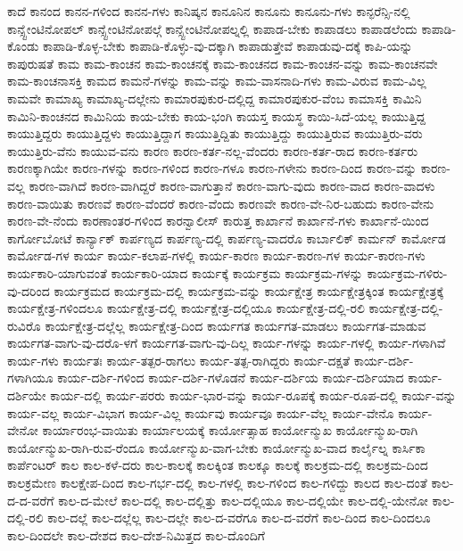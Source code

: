 {ಕಾದೆ
ಕಾನಂದ
ಕಾನನ-ಗಳಿಂದ
ಕಾನನ-ಗಳು
ಕಾನಿಷ್ಕನ
ಕಾನೂನಿನ
ಕಾನೂನು
ಕಾನೂನು-ಗಳು
ಕಾನ್ಫರೆನ್ಸಿ-ನಲ್ಲಿ
ಕಾನ್ಸ್ಟೇಂಟಿನೋಪಲ್
ಕಾನ್ಸ್ಟೇಂಟಿನೋಪಲ್ಗೆ
ಕಾನ್ಸ್ಟೇಂಟಿನೋಪಲ್ನಲ್ಲಿ
ಕಾಪಾಡ-ಬೇಕು
ಕಾಪಾಡಲು
ಕಾಪಾಡಲೆಂದು
ಕಾಪಾಡಿ-ಕೊಂಡು
ಕಾಪಾಡಿ-ಕೊಳ್ಳ-ಬೇಕು
ಕಾಪಾಡಿ-ಕೊಳ್ಳು-ವು-ದಕ್ಕಾಗಿ
ಕಾಪಾಡುತ್ತೇವೆ
ಕಾಪಾಡುವು-ದಕ್ಕೆ
ಕಾಪಿ-ಯನ್ನು
ಕಾಪುರುಷತೆ
ಕಾಮ
ಕಾಮ-ಕಾಂಚನ
ಕಾಮ-ಕಾಂಚನಕ್ಕೆ
ಕಾಮ-ಕಾಂಚನದ
ಕಾಮ-ಕಾಂಚನ-ವನ್ನು
ಕಾಮ-ಕಾಂಚನವೇ
ಕಾಮ-ಕಾಂಚನಾಸಕ್ತಿ
ಕಾಮದ
ಕಾಮನೆ-ಗಳನ್ನು
ಕಾಮ-ವನ್ನು
ಕಾಮ-ವಾಸನಾದಿ-ಗಳು
ಕಾಮ-ವಿರುವ
ಕಾಮ-ವಿಲ್ಲ
ಕಾಮವೇ
ಕಾಮಾಖ್ಯ
ಕಾಮಾಖ್ಯ-ದಲ್ಲೇನು
ಕಾಮಾರಪುಕುರ-ದಲ್ಲಿದ್ದ
ಕಾಮಾರಪುಕುರ-ವೆಂಬ
ಕಾಮಾಸಕ್ತಿ
ಕಾಮಿನಿ
ಕಾಮಿನಿ-ಕಾಂಚನದ
ಕಾಮಿನಿಯ
ಕಾಯ-ಬೇಕು
ಕಾಯ-ಭಂಗಿ
ಕಾಯಸ್ತ
ಕಾಯಸ್ಥ
ಕಾಯಿ-ಸಿದೆ-ಯಲ್ಲ
ಕಾಯುತ್ತಿದ್ದ
ಕಾಯುತ್ತಿದ್ದರು
ಕಾಯುತ್ತಿದ್ದಳು
ಕಾಯುತ್ತಿದ್ದಾಗ
ಕಾಯುತ್ತಿದ್ದಿತು
ಕಾಯುತ್ತಿದ್ದು
ಕಾಯುತ್ತಿರುವ
ಕಾಯುತ್ತಿರು-ವರು
ಕಾಯುತ್ತಿರು-ವೆನು
ಕಾಯುವ-ವನು
ಕಾರಣ
ಕಾರಣ-ಕರ್ತ-ನಲ್ಲ-ವೆಂದರು
ಕಾರಣ-ಕರ್ತ-ರಾದ
ಕಾರಣ-ಕರ್ತರು
ಕಾರಣಕ್ಕಾಗಿಯೇ
ಕಾರಣ-ಗಳನ್ನು
ಕಾರಣ-ಗಳಿಂದ
ಕಾರಣ-ಗಳೂ
ಕಾರಣ-ಗಳೇನು
ಕಾರಣ-ದಿಂದ
ಕಾರಣ-ವನ್ನು
ಕಾರಣ-ವಲ್ಲ
ಕಾರಣ-ವಾಗಿದೆ
ಕಾರಣ-ವಾಗಿದ್ದರೆ
ಕಾರಣ-ವಾಗುತ್ತಾನೆ
ಕಾರಣ-ವಾಗು-ವುದು
ಕಾರಣ-ವಾದ
ಕಾರಣ-ವಾದಳು
ಕಾರಣ-ವಾಯಿತು
ಕಾರಣವೆ
ಕಾರಣ-ವೆಂದರೆ
ಕಾರಣ-ವೆಂದು
ಕಾರಣವೇ
ಕಾರಣ-ವೇ-ನಿರ-ಬಹುದು
ಕಾರಣ-ವೇನು
ಕಾರಣ-ವೇ-ನೆಂದು
ಕಾರಣಾಂತರ-ಗಳಿಂದ
ಕಾರನ್ವಾಲೀಸ್
ಕಾರುತ್ತ
ಕಾರ್ಖಾನೆ
ಕಾರ್ಖಾನೆ-ಗಳು
ಕಾರ್ಖಾನೆ-ಯಿಂದ
ಕಾರ್ಗೋಬೋಟೆ
ಕಾರ್ನ್ಯಾಕ್
ಕಾರ್ಪಣ್ಯದ
ಕಾರ್ಪಣ್ಯ-ದಲ್ಲಿ
ಕಾರ್ಪಣ್ಯ-ವಾದರೊ
ಕಾರ್ಬಾಲಿಕ್
ಕಾರ್ಮನ್
ಕಾರ್ಮೋಡ
ಕಾರ್ಮೋಡ-ಗಳ
ಕಾರ್ಯ
ಕಾರ್ಯ-ಕಲಾಪ-ಗಳಲ್ಲಿ
ಕಾರ್ಯ-ಕಾರಣ
ಕಾರ್ಯ-ಕಾರಣ-ಗಳ
ಕಾರ್ಯ-ಕಾರಣ-ಗಳು
ಕಾರ್ಯಕಾರಿ-ಯಾಗುವಂತೆ
ಕಾರ್ಯಕಾರಿ-ಯಾದ
ಕಾರ್ಯಕ್ಕೆ
ಕಾರ್ಯಕ್ರಮ
ಕಾರ್ಯಕ್ರಮ-ಗಳನ್ನು
ಕಾರ್ಯಕ್ರಮ-ಗಳಿರು-ವು-ದರಿಂದ
ಕಾರ್ಯಕ್ರಮದ
ಕಾರ್ಯಕ್ರಮ-ದಲ್ಲಿ
ಕಾರ್ಯಕ್ರಮ-ವನ್ನು
ಕಾರ್ಯಕ್ಷೇತ್ರ
ಕಾರ್ಯಕ್ಷೇತ್ರಕ್ಕಿಂತ
ಕಾರ್ಯಕ್ಷೇತ್ರಕ್ಕೆ
ಕಾರ್ಯಕ್ಷೇತ್ರ-ಗಳಿಂದಲೂ
ಕಾರ್ಯಕ್ಷೇತ್ರ-ದಲ್ಲಿ
ಕಾರ್ಯಕ್ಷೇತ್ರ-ದಲ್ಲಿಯೂ
ಕಾರ್ಯಕ್ಷೇತ್ರ-ದಲ್ಲಿ-ರಲಿ
ಕಾರ್ಯಕ್ಷೇತ್ರ-ದಲ್ಲಿ-ರುವಿರೊ
ಕಾರ್ಯಕ್ಷೇತ್ರ-ದಲ್ಲೆಲ್ಲ
ಕಾರ್ಯಕ್ಷೇತ್ರ-ದಿಂದ
ಕಾರ್ಯಗತ
ಕಾರ್ಯಗತ-ಮಾಡಲು
ಕಾರ್ಯಗತ-ಮಾಡುವ
ಕಾರ್ಯಗತ-ವಾಗು-ವು-ದರೊ-ಳಗೆ
ಕಾರ್ಯಗತ-ವಾಗು-ವು-ದಿಲ್ಲ
ಕಾರ್ಯ-ಗಳನ್ನು
ಕಾರ್ಯ-ಗಳಲ್ಲಿ
ಕಾರ್ಯ-ಗಳಾಗಿವೆ
ಕಾರ್ಯ-ಗಳು
ಕಾರ್ಯತಃ
ಕಾರ್ಯ-ತತ್ಪರ-ರಾಗಲು
ಕಾರ್ಯ-ತತ್ಪ-ರಾಗಿದ್ದರು
ಕಾರ್ಯ-ದಕ್ಷತೆ
ಕಾರ್ಯ-ದರ್ಶಿ-ಗಳಾಗಿಯೂ
ಕಾರ್ಯ-ದರ್ಶಿ-ಗಳಿಂದ
ಕಾರ್ಯ-ದರ್ಶಿ-ಗಳೊಡನೆ
ಕಾರ್ಯ-ದರ್ಶಿಯ
ಕಾರ್ಯ-ದರ್ಶಿಯಾದ
ಕಾರ್ಯ-ದರ್ಶಿಯೇ
ಕಾರ್ಯ-ದಲ್ಲಿ
ಕಾರ್ಯ-ಪರರು
ಕಾರ್ಯ-ಭಾರ-ವನ್ನು
ಕಾರ್ಯ-ರೂಪಕ್ಕೆ
ಕಾರ್ಯ-ರೂಪ-ದಲ್ಲಿ
ಕಾರ್ಯ-ವನ್ನು
ಕಾರ್ಯ-ವಲ್ಲ
ಕಾರ್ಯ-ವಿಭಾಗ
ಕಾರ್ಯ-ವಿಲ್ಲ
ಕಾರ್ಯವು
ಕಾರ್ಯವೂ
ಕಾರ್ಯ-ವೆಲ್ಲ
ಕಾರ್ಯ-ವೇನೊ
ಕಾರ್ಯ-ವೇನೋ
ಕಾರ್ಯಾರಂಭ-ವಾಯಿತು
ಕಾರ್ಯಾಲಯಕ್ಕೆ
ಕಾರ್ಯೋತ್ಸಾಹ
ಕಾರ್ಯೋನ್ಮುಖ
ಕಾರ್ಯೋನ್ಮುಖ-ರಾಗಿ
ಕಾರ್ಯೋನ್ಮುಖ-ರಾಗಿ-ರುವ-ರೆಂದೂ
ಕಾರ್ಯೋನ್ಮುಖ-ವಾಗ-ಬೇಕು
ಕಾರ್ಯೋನ್ಮುಖ-ವಾದ
ಕಾರ್ಲೈಲ್ನ
ಕಾರ್ಸಿಕಾ
ಕಾರ್ಪೆಂಟರ್
ಕಾಲ
ಕಾಲ-ಕಳೆ-ದರು
ಕಾಲ-ಕಾಲಕ್ಕೆ
ಕಾಲಕ್ಕಿಂತ
ಕಾಲಕ್ಕೂ
ಕಾಲಕ್ಕೆ
ಕಾಲಕ್ರಮ-ದಲ್ಲಿ
ಕಾಲಕ್ರಮ-ದಿಂದ
ಕಾಲಕ್ರಮೇಣ
ಕಾಲಕ್ಷೇಪ-ದಿಂದ
ಕಾಲ-ಗರ್ಭ-ದಲ್ಲಿ
ಕಾಲ-ಗಳಲ್ಲಿ
ಕಾಲ-ಗಳಿಂದ
ಕಾಲ-ಗಳಿದ್ದು
ಕಾಲದ
ಕಾಲ-ದಂತೆ
ಕಾಲ-ದ-ದ-ವರೆಗೆ
ಕಾಲ-ದ-ಮೇಲೆ
ಕಾಲ-ದಲ್ಲಿ
ಕಾಲ-ದಲ್ಲಿತ್ತು
ಕಾಲ-ದಲ್ಲಿಯೂ
ಕಾಲ-ದಲ್ಲಿಯೇ
ಕಾಲ-ದಲ್ಲಿ-ಯೇನೋ
ಕಾಲ-ದಲ್ಲಿ-ರಲಿ
ಕಾಲ-ದಲ್ಲೆ
ಕಾಲ-ದಲ್ಲೆಲ್ಲ
ಕಾಲ-ದಲ್ಲೇ
ಕಾಲ-ದ-ವರೆಗೂ
ಕಾಲ-ದ-ವರೆಗೆ
ಕಾಲ-ದಿಂದ
ಕಾಲ-ದಿಂದಲೂ
ಕಾಲ-ದಿಂದಲೇ
ಕಾಲ-ದೇಶದ
ಕಾಲ-ದೇಶ-ನಿಮಿತ್ತದ
ಕಾಲ-ದೊಂದಿಗೆ
}
